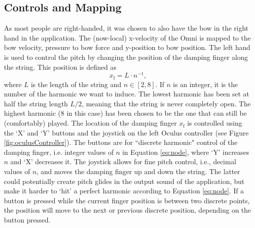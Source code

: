 \documentclass[dvipsnames, pdftex]{article}
\begin{document}
\subsection{Controls and Mapping}\label{sec:controls}
As most people are right-handed, it was chosen to also have the bow in the right hand in the application. The (now-local) x-velocity of the Omni is mapped to the bow velocity, pressure to bow force and y-position to bow position. The left hand is used to control the pitch by changing the position of the damping finger along the string. This position is defined as  
\begin{equation}\label{eq:node}
    x_\text{f} = L\cdot n^{-1},
\end{equation}
where $L$ is the length of the string and $n \in [2,8]$. If $n$ is an integer, it is the number of the harmonic we want to induce. The lowest harmonic has been set at half the string length $L/2$, meaning that the string is never completely open. The highest harmonic (8 in this case) has been chosen to be the one that can still be (comfortably) played. The location of the damping finger $x_\text{f}$ is controlled using the `X' and `Y' buttons and the joystick on the left Oculus controller (see Figure \ref{fig:oculusController}). The buttons are for ``discrete harmonic" control of the damping finger, i.e. integer values of $n$ in Equation \eqref{eq:node}, where `Y' increases $n$ and `X' decreases it. The joystick allows for fine pitch control, i.e., decimal values of $n$,  and moves the damping finger up and down the string. The latter could potentially create pitch glides in the output sound of the application, but make it harder to `hit' a perfect harmonic according to Equation \eqref{eq:node}. If a button is pressed while the current finger position is between two discrete points, the position will move to the next or previous discrete position, depending on the button pressed.
\end{document}
